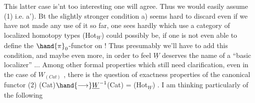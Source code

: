 This latter case is'nt too interesting one will agree.  Thus we
would easily assume (1) i.e. a'). Bt the slightly stronger condition
a) seems hard to discard\over{,}{;} even if we have not made any use of it so far,
one sees hardly  which use a category of localized homotopy types (Hot$_{\underline{W}}$)
could possibly be, if one is not even able to define the $\hand{\pi}_0$-functor on
 ! Thus presumably we'll have to add this condition, and maybe even
more, in order to feel $\underline{W}$ deserves the name of a ``basic localizer'' ...
Among other formal properties which still need clarification, even in 
the case of $W_{(Cat)}$\hand{,} , there is the question of exactness properties
of the canonical functor
(2) \qquad (Cat)$\hand{\longrightarrow} \underline{W}^{-1}$(Cat) = (Hot$_{\underline{W}}$) .
I am thinking particularly of the following

